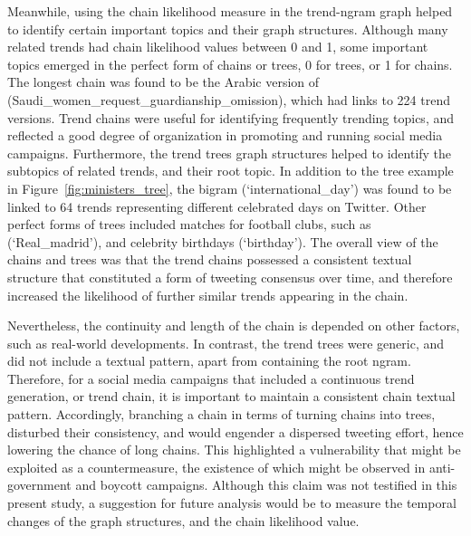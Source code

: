 \documentclass[conference]{IEEEtran}
\begin{document}
{Meanwhile, using the chain likelihood measure in the trend-ngram graph helped 
to identify certain important topics and their graph structures. Although many 
related trends had chain likelihood values between 0 and 1, some important topics 
emerged in the perfect form of chains or trees, 0 for trees, or 1 for chains. 
The longest chain was found to be the Arabic version of
(Saudi\_women\_request\_guardianship\_omission), which had links to 224 trend 
versions. Trend chains were useful for identifying frequently trending topics, 
and reflected a good degree of organization in promoting and running social 
media campaigns. Furthermore, the trend trees graph structures helped to identify 
the subtopics of related trends, and their root topic. In addition to the tree example 
in Figure~\ref{fig:ministers_tree}, the bigram (‘international\_day’) 
was found to be linked to 64 trends representing different celebrated days on Twitter. Other perfect forms 
of trees included matches for football clubs, such as (‘Real\_madrid’), and 
celebrity birthdays (‘birthday’). 
The overall view of the chains and trees was that the trend chains possessed a 
consistent textual structure that constituted a form of tweeting consensus over time, 
and therefore increased the likelihood of further similar trends appearing in the chain. 


Nevertheless, the continuity and length of the chain is depended on other factors, such 
as real-world developments. In contrast, the trend trees were generic, and did not 
include a textual pattern, apart from containing the root ngram. 
Therefore, for a social media campaigns that included a continuous trend generation,
or trend chain, it is important to maintain a consistent chain textual pattern. Accordingly,
branching a chain in terms of turning chains into trees, disturbed their consistency, and 
would engender a dispersed tweeting effort, hence lowering the chance of long chains. 
This highlighted a vulnerability that might be exploited as a countermeasure, the existence 
of which might be observed in anti-government and boycott campaigns. Although this 
claim was not testified in this present study, a suggestion for future analysis would be to 
measure the temporal changes of the graph structures, and the chain likelihood value.  


}
\end{document}
